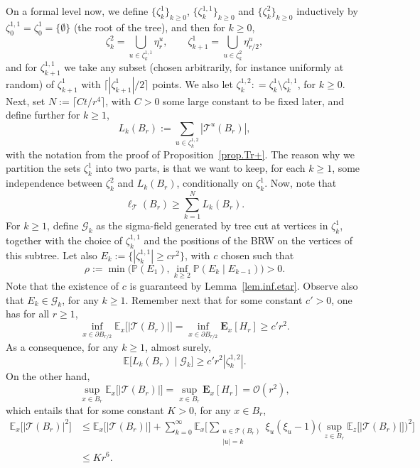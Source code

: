 \documentclass[JEP,XML,SOM,Unicode,NoFloatCountersInSection,published]{cedram}
\let\ts\textstyle
\theoremstyle{plain}
\theoremstyle{definition}
\newcommand{\1}{{\text{\Large $\mathfrak 1$}}}
\begin{document}
On a formal level now, we define $\{\zeta_k^1\}_{k\ge 0}$,
$\{\zeta_k^{1,1}\}_{k\ge 0}$ and $\{\zeta_k^2\}_{k\ge 0}$ inductively by
$\zeta_0^{1,1} = \zeta_0^1 = \{\emptyset\}$ (the root of the tree), and then for $k\ge 0$,
\[
\zeta_k^2 = \bigcup_{u\in \zeta_k^{1,1}}
\eta^u_r, \qquad \zeta_{k+1}^1 = \bigcup_{u\in \zeta_k^2}
\eta^u_{r/2},
\]
and for $\zeta_{k+1}^{1,1}$ we take any subset (chosen arbitrarily, for instance uniformly at random) of $\zeta_{k+1}^1$
with $\lceil |\zeta_{k+1}^1|/2\rceil$ points. We also let $\zeta_k^{1,2}: = \zeta_k^1\setminus \zeta_k^{1,1}$, for $k\ge 0$.
Next, set $N:=\lceil Ct/r^4\rceil$, with $C>0$ some large constant to be fixed later, and define further for $k\ge 1$,
\[
L_k(B_r):= \sum_{u\in \zeta_k^{1,2}} |\mathcal T^u(B_r)|,
\]
with the notation from the proof of Proposition~\ref{prop.Tr+}. The reason why we partition the sets $\zeta_k^1$ into two parts, is that we want to keep,
for each $k\ge 1$, some independence between $\zeta_k^2$ and $L_k(B_r)$, conditionally on $\zeta_k^1$.
Now, note that
\begin{equation}\label{ellinfty}
\ell_{\mathcal T}(B_r) \ge \sum_{k=1}^N L_k(B_r).
\end{equation}
For $k\ge 1$, define $\mathcal G_k$ as the sigma-field generated by tree cut at vertices in $\zeta_k^1$, together with the choice of $\zeta_k^{1,1}$ and the positions of the BRW on the vertices of this subtree. Let also $E_k:=\{|\zeta_k^{1,1}|\ge cr^2\}$, with $c$ chosen such that
\begin{equation}\label{rho.def}
\rho:=\min\Big(\mathbb P(E_1), \inf_{k\ge 2} \mathbb P(E_k\mid E_{k-1})\Big)>0.
\end{equation}
Note that the existence of $c$ is
guaranteed by Lemma~\ref{lem.inf.etar}. Observe also that $E_k\in \mathcal G_k$, for any $k\ge 1$.
Remember next that for some constant $c'>0$, one has for all $r\ge 1$,
\[
\inf_{x\in \partial B_{r/2}} \mathbb E_x\big[|\mathcal T(B_r)|\big] = \inf_{x\in \partial B_{r/2}} \mathbf E_x[H_r]\ge c'r^2.
\]
As a consequence, for any $k\ge 1$, almost surely,
\[
\mathbb E \big[L_k(B_r)\mid \mathcal G_k]\ge c'r^2|\zeta_k^{1,2}|.
\]
On the other hand,
\[
\sup_{x\in B_r} \mathbb E_x\big[|\mathcal T(B_r)|\big] =\sup_{x\in B_r} \mathbf E_x[H_r] = \mathcal O(r^2),
\]
which entails that for some constant $K>0$, for any $x\in B_r$,
\begin{align*}
\mathbb E_x\big[|\mathcal T(B_r)|^2\big]
&\le \mathbb E_x \big[|\mathcal T(B_r)|\big]
+ \sum_{k=0}^\infty \mathbb E_x\Big[{\ts\sum_{\substack{u\in \mathcal T(B_r) \\ |u|=k}}} \xi_u(\xi_u-1)\Big(\sup_{z\in B_r}
\mathbb E_z\big[|\mathcal T(B_r)|\big]\Big)^2\Big]\\
&\le Kr^6.
\end{align*}
\end{document}
